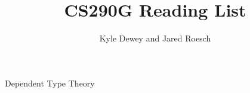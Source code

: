 \documentclass{article}
\begin{document}
\title{CS290G Reading List}
\author{Kyle Dewey and Jared Roesch}
\maketitle

\begin{pgroup}{Dependent Type Theory}
\end{pgroup}



\end{document}
